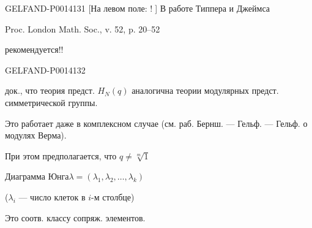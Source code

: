 \begin{GelfandAdjacentEvidence}{GELFAND-P001413}{1}
[На левом поле: \textcircled{!}]
В работе Типпера и Джеймса

Proc. London Math. Soc., v. 52, p. 20--52

рекомендуется!!

\end{GelfandAdjacentEvidence}
\begin{GelfandAdjacentEvidence}{GELFAND-P001413}{2}


док., что теория предст. \(H_N(q)\) аналогична теории модулярных предст. симметрической группы.

Это работает даже в комплексном случае (см. раб. Бернш. — Гельф. — Гельф. о модулях Верма).

При этом предполагается, что \(q\ne\sqrt[m]{1}\)


Диаграмма Юнга\quad \(\lambda=(\lambda_1,\lambda_2,\ldots,\lambda_k)\)

\end{GelfandAdjacentEvidence}


(\(\lambda_i\) — число клеток в \(i\)-м столбце)

Это соотв. классу сопряж. элементов.


